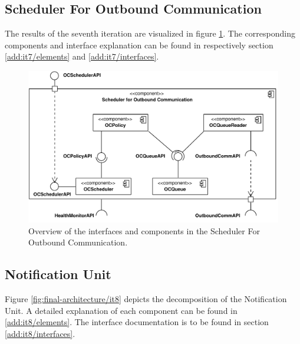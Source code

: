 \subsection{Scheduler For Outbound Communication}

\npar The results of the seventh iteration are visualized in figure
\ref{fig:final-architecture/it7}. The corresponding components and interface
explanation can be found in respectively section \ref{add:it7/elements} and
\ref{add:it7/interfaces}.

\begin{figure}[H]
	\begin{centering}
		\includegraphics[width=\textwidth]{figs/add-it7-interfaces.pdf}
		\caption{Overview of the interfaces and components in the Scheduler For
		Outbound Communication.}
		\label{fig:final-architecture/it7}
	\end{centering}
\end{figure}

\subsection{Notification Unit}

\npar Figure \ref{fig:final-architecture/it8} depicts the decomposition of the
Notification Unit. A detailed explanation of each component can be found in
\ref{add:it8/elements}. The interface documentation is to be found in section
\ref{add:it8/interfaces}.

